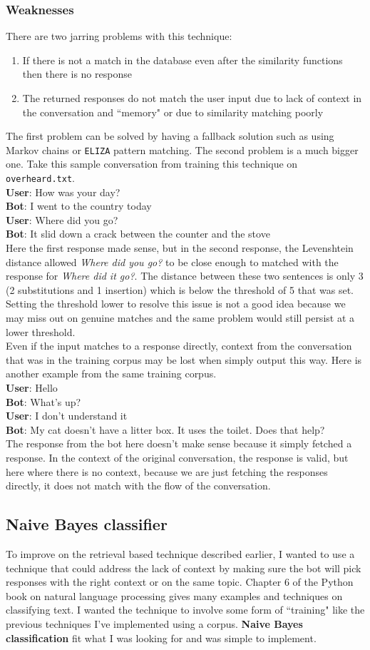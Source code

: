 \documentclass{article}
\newcommand{\n}[0]{\\[\baselineskip]}
\begin{document}
\subsubsection{Weaknesses}
There are two jarring problems with this technique:
\begin{enumerate}
\item If there is not a match in the database even after the similarity functions then there is no response
\item The returned responses do not match the user input due to lack of context in the conversation and ``memory" or due to similarity matching poorly
\end{enumerate}
The first problem can be solved by having a fallback solution such as using Markov chains or \texttt{ELIZA} pattern matching. The second problem is a much bigger one. Take this sample conversation from training this technique on \texttt{overheard.txt}.
\n
\textbf{User}: How was your day?
\\ \textbf{Bot}: I went to the country today
\\ \textbf{User}: Where did you go?
\\ \textbf{Bot}: It slid down a crack between the counter and the stove
\n
Here the first response made sense, but in the second response, the Levenshtein distance allowed \textit{Where did you go?} to be close enough to matched with the response for \textit{Where did it go?}. The distance between these two sentences is only 3 (2 substitutions and 1 insertion) which is below the threshold of 5 that was set. Setting the threshold lower to resolve this issue is not a good idea because we may miss out on genuine matches and the same problem would still persist at a lower threshold. 
\n
Even if the input matches to a response directly, context from the conversation that was in the training corpus may be lost when simply output this way. Here is another example from the same training corpus.
\n
\textbf{User}: Hello
\\ \textbf{Bot}: What's up?
\\ \textbf{User}: I don't understand it
\\ \textbf{Bot}: My cat doesn't have a litter box. It uses the toilet. Does that help?
\n 
The response from the bot here doesn't make sense because it simply fetched a response. In the context of the original conversation, the response is valid, but here where there is no context, because we are just fetching the responses directly, it does not match with the flow of the conversation. 
\subsection{Naive Bayes classifier}
To improve on the retrieval based technique described earlier, I wanted to use a technique that could address the lack of context by making sure the bot will pick responses with the right context or on the same topic. Chapter 6 of the Python book on natural language processing \cite{nltk} gives many examples and techniques on classifying text. I wanted the technique to involve some form of ``training" like the previous techniques I've implemented using a corpus. \textbf{Naive Bayes classification} fit what I was looking for and was simple to implement.
\n
\end{document}

